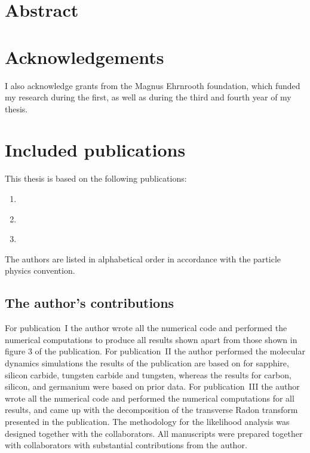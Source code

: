 \documentclass[b5paper, 10pt, twoside]{book}
\begin{document}
\tableofcontents

\chapter{Abstract}

\chapter{Acknowledgements}




I also acknowledge grants from the Magnus Ehrnrooth foundation, which funded my research during the first, as well as during the third and fourth year of my thesis.

\chapter{Included publications}

This thesis is based on the following publications:
\begin{enumerate}[label=\Roman*,ref=\Roman*]
\item\label{pub:sassi2021} 
\item\label{pub:sassi2022} 
\item\label{pub:sassi2024} 
\end{enumerate}
The authors are listed in alphabetical order in accordance with the particle physics convention.

\section*{The author's contributions}

For publication~I the author wrote all the numerical code and performed the numerical computations to produce all results shown apart from those shown in figure 3 of the publication. For publication~II the author performed the molecular dynamics simulations the results of the publication are based on for sapphire, silicon carbide, tungsten carbide and tungsten, whereas the results for carbon, silicon, and germanium were based on prior data. For publication~III the author wrote all the numerical code and performed the numerical computations for all results, and came up with the decomposition of the transverse Radon transform presented in the publication. The methodology for the likelihood analysis was designed together with the collaborators. All manuscripts were prepared together with collaborators with substantial contributions from the author.
\end{document}
